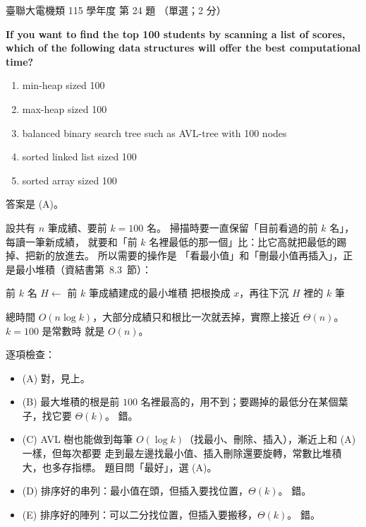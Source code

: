 \begin{pastexam}[label={px:ust-115-ee-ds-24}]{臺聯大電機類 115 學年度 第 24 題}
（單選；2 分）

\textbf{If you want to find the top 100 students by scanning a list of scores, which of the
following data structures will offer the best computational time?}
\begin{enumerate}[label=(\Alph*)]
\item min-heap sized 100
\item max-heap sized 100
\item balanced binary search tree such as AVL-tree with 100 nodes
\item sorted linked list sized 100
\item sorted array sized 100
\end{enumerate}
\end{pastexam}

\begin{pastsoln}
答案是 (A)。

設共有 $n$ 筆成績、要前 $k = 100$ 名。 掃描時要一直保留「目前看過的前 $k$ 名」，每讀一筆新成績，
就要和「前 $k$ 名裡最低的那一個」比：比它高就把最低的踢掉、把新的放進去。 所以需要的操作是
「看最小值」和「刪最小值再插入」，正是最小堆積（資結書第~8.3~節）：
\begin{pseudo}{前 $k$ 名}
\State $H \gets$ 前 $k$ 筆成績建成的最小堆積 
     
        \State 把根換成 $x$，再往下沉 
    \EndIf
\EndFor
\State \Return $H$ 裡的 $k$ 筆
\end{pseudo}
總時間 $O(n \log k)$，大部分成績只和根比一次就丟掉，實際上接近 $\Theta(n)$。 $k = 100$ 是常數時
就是 $O(n)$。

逐項檢查：
\begin{itemize}
\item (A) 對，見上。
\item (B) 最大堆積的根是前 $100$ 名裡最高的，用不到；要踢掉的最低分在某個葉子，找它要 $\Theta(k)$。 錯。
\item (C) AVL 樹也能做到每筆 $O(\log k)$（找最小、刪除、插入），漸近上和 (A) 一樣，但每次都要
走到最左邊找最小值、插入刪除還要旋轉，常數比堆積大，也多存指標。 題目問「最好」，選 (A)。
\item (D) 排序好的串列：最小值在頭，但插入要找位置，$\Theta(k)$。 錯。
\item (E) 排序好的陣列：可以二分找位置，但插入要搬移，$\Theta(k)$。 錯。
\end{itemize}
\end{pastsoln}
